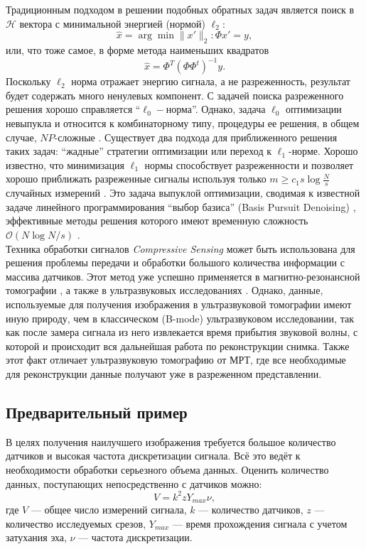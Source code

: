 \documentclass[14pt]{matmex-diploma-custom}
\begin{document}
Традиционным подходом в решении подобных обратных задач является поиск в $\mathcal{H}$ вектора с минимальной энергией (нормой)  $\ell_2$: $$ \hat{x} = \arg\!\min{\| x'\|_2} : \Phi x' = y,$$ или, что тоже самое, в форме метода наименьших квадратов
$$\hat{x} = \Phi^T (\Phi\Phi^t)^{-1}y.$$
Поскольку $\ell_2$ норма  отражает энергию сигнала, а не разреженность, результат будет содержать много ненулевых компонент. С задачей поиска разреженного решения хорошо справляется ``$\ell_0-$норма''. Однако, задача $\ell_0$ оптимизации невыпукла и относится к комбинаторному типу, процедуры ее решения, в общем случае, $NP$-сложные \cite{natarajan1995sparse}. Существует два подхода для приближенного решения таких задач: ``жадные'' стратегии оптимизации \cite{mallat1993matching} или переход к $\ell_1$-норме. Хорошо известно, что минимизация $\ell_1$ нормы способствует разреженности \cite{donoho2006most} и позволяет хорошо приближать разреженные сигналы используя только $m \geq c_1 s \log{\frac{N}{s}}$ случайных измерений \cite{donoho2006compressed}\cite{candes2006robust}. Это задача выпуклой оптимизации, сводимая к известной задаче линейного программирования ``выбор базиса'' (Basis Pursuit Denoising) \cite{chen2001atomic}, эффективные методы решения которого имеют временную сложность $\mathcal{O}(N\log{N/s})$ \cite{berinde2008practical}.\\

Техника обработки сигналов \textit{Compressive Sensing} может быть использована для решения проблемы передачи и обработки большого количества информации с массива датчиков. Этот метод уже успешно применяется в магнитно-резонансной томографии \cite{lustig2007sparse, lustig2008compressed}, а также в ультразвуковых исследованиях \cite{quinsac2010compressed}. Однако, данные, используемые для получения изображения в ультразвуковой томографии имеют иную природу, чем в классическом (B-mode) ультразвуковом исследовании, так как после замера сигнала из него извлекается время прибытия звуковой волны, с которой и происходит вся дальнейшая работа по реконструкции снимка. Также этот факт отличает ультразвуковую томографию от МРТ, где все необходимые для реконструкции данные получают уже в разреженном представлении.

\subsection{Предварительный пример}

В целях получения наилучшего изображения требуется большое количество датчиков и высокая частота дискретизации сигнала. Всё это ведёт к необходимости обработки серьезного объема данных. Оценить количество данных, поступающих непосредственно с датчиков можно:
\[ V = k^2  z  Y_{max} \nu,   \]
где $V$ --- общее число измерений сигнала, $k$ --- количество датчиков, $z$ --- количество исследуемых срезов, $Y_{max}$ --- время прохождения сигнала с учетом затухания эха, $\nu$ --- частота дискретизации. \\
\end{document}

